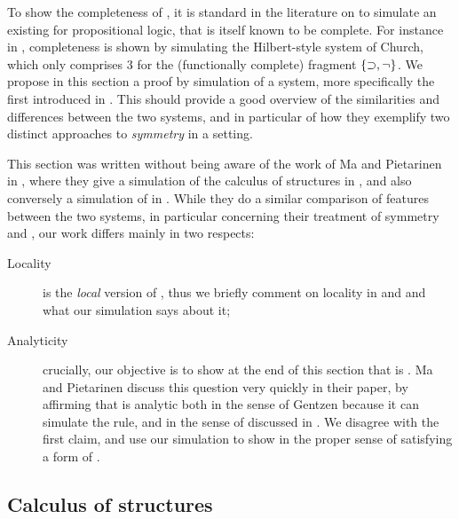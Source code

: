 \begin{scope}
\begin{scope}
\AP
To show the completeness of , it is standard in the literature on
 to simulate an existing  for 
propositional logic, that is itself known to be complete. For instance in
\cite{Roberts+1973}, completeness is shown by simulating the Hilbert-style
system  of Church, which only comprises 3  for the
(functionally complete) fragment $\{\supset, \neg\}$. We propose in this section a
proof by simulation of a \emph{} system, more specifically
the   first introduced in
. This should provide a good overview of the
similarities and differences between the two systems, and in particular of how
they exemplify two distinct approaches to \emph{symmetry} in a  setting.

\begin{kaonote}
  This section was written without being aware of the work of Ma and Pietarinen
  in , where they give a simulation of the calculus of
  structures  in , and also conversely a simulation of
   in . While they do a similar comparison of features
  between the two systems, in particular concerning their treatment of symmetry
  and , our work differs mainly in two respects:
  \begin{description}
    \item[Locality]  is the \emph{local} version of , thus we
    briefly comment on locality in  and  and what our
    simulation says about it;
    \item[Analyticity] crucially, our objective is to show at the end of this
    section that  is \emph{}. Ma and Pietarinen discuss
    this question very quickly in their paper, by affirming that  is
    analytic both in the sense of Gentzen because it can simulate the 
    rule, and in the sense of \emph{} discussed in
    . We disagree with the first claim, and use our simulation
    to show  in the proper sense of satisfying a form of
    .
  \end{description}
\end{kaonote}

\subsection{Calculus of structures}


\end{scope}
\end{scope}
